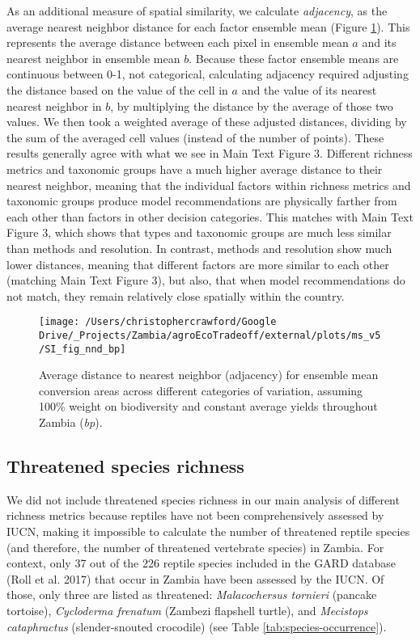 \documentclass[
]{article}
\begin{document}
As an additional measure of spatial similarity, we calculate \emph{adjacency}, as the average nearest neighbor distance for each factor ensemble mean (Figure \ref{fig:nnd-fig}). This represents the average distance between each pixel in ensemble mean \(a\) and its nearest neighbor in ensemble mean \(b\). Because these factor ensemble means are continuous between 0-1, not categorical, calculating adjacency required adjusting the distance based on the value of the cell in \(a\) and the value of its nearest nearest neighbor in \(b\), by multiplying the distance by the average of those two values. We then took a weighted average of these adjusted distances, dividing by the sum of the averaged cell values (instead of the number of points). These results generally agree with what we see in Main Text Figure 3. Different richness metrics and taxonomic groups have a much higher average distance to their nearest neighbor, meaning that the individual factors within richness metrics and taxonomic groups produce model recommendations are physically farther from each other than factors in other decision categories. This matches with Main Text Figure 3, which shows that types and taxonomic groups are much less similar than methods and resolution. In contrast, methods and resolution show much lower distances, meaning that different factors are more similar to each other (matching Main Text Figure 3), but also, that when model recommendations do not match, they remain relatively close spatially within the country.



\begin{figure}
\texttt{[image: /Users/christophercrawford/Google Drive/\_Projects/Zambia/agroEcoTradeoff/external/plots/ms\_v5/SI\_fig\_nnd\_bp]} \caption{Average distance to nearest neighbor (adjacency) for ensemble mean conversion areas across different categories of variation, assuming 100\% weight on biodiversity and constant average yields throughout Zambia (\emph{bp}).}\label{fig:nnd-fig}
\end{figure}

\newpage

\hypertarget{section-threat}{%
\subsection{Threatened species richness}\label{section-threat}}

We did not include threatened species richness in our main analysis of different richness metrics because reptiles have not been comprehensively assessed by IUCN, making it impossible to calculate the number of threatened reptile species (and therefore, the number of threatened vertebrate species) in Zambia. For context, only 37 out of the 226 reptile species included in the GARD database (Roll et al. 2017) that occur in Zambia have been assessed by the IUCN. Of those, only three are listed as threatened: \emph{Malacochersus tornieri} (pancake tortoise), \emph{Cycloderma frenatum} (Zambezi flapshell turtle), and \emph{Mecistops cataphractus} (slender-snouted crocodile) (see Table \ref{tab:species-occurrence}).
\end{document}
